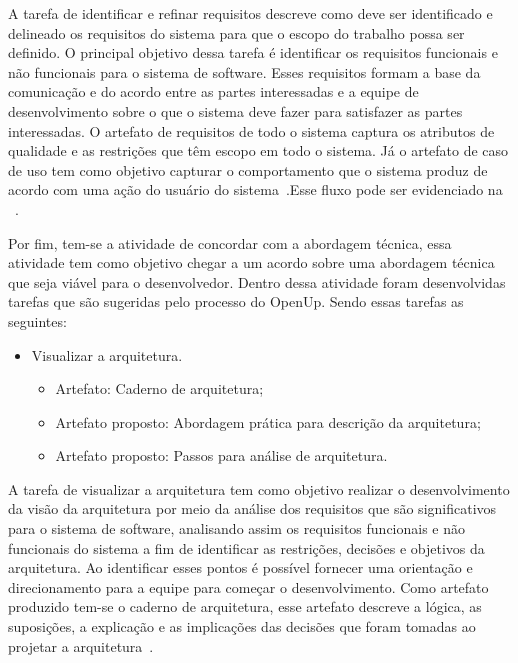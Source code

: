 %

A tarefa de identificar e refinar requisitos descreve como deve ser identificado e delineado os requisitos do sistema para que o escopo do trabalho possa ser definido. O principal objetivo dessa tarefa é identificar os requisitos funcionais e não funcionais para o sistema de software. Esses requisitos formam a base da comunicação e do acordo entre as partes interessadas e a equipe de desenvolvimento sobre o que o sistema deve fazer para satisfazer as partes interessadas. O artefato de requisitos de todo o sistema captura os atributos de qualidade e as restrições que têm escopo em todo o sistema. Já o artefato de caso de uso tem como objetivo capturar o comportamento que o sistema produz de acordo com uma ação do usuário do sistema~\cite{openup}.Esse fluxo pode ser evidenciado na ~.


Por fim, tem-se a atividade de concordar com a abordagem técnica, essa atividade tem como objetivo chegar a um acordo sobre uma abordagem técnica que seja viável para o desenvolvedor. Dentro dessa atividade foram desenvolvidas tarefas que são sugeridas pelo processo do \acrfull{OpenUp}. Sendo essas tarefas as seguintes:
\begin{itemize}
    \item Visualizar a arquitetura.
    \begin{itemize}
        \item Artefato: Caderno de arquitetura;
        \item Artefato proposto: Abordagem prática para descrição da arquitetura;
        \item Artefato proposto: Passos para análise de arquitetura.
    \end{itemize}
\end{itemize}

A tarefa de visualizar a arquitetura tem como objetivo realizar o desenvolvimento da visão da arquitetura por meio da análise dos requisitos que são significativos para o sistema de software, analisando assim os requisitos funcionais e não funcionais do sistema a fim de identificar as restrições, decisões e objetivos da arquitetura. Ao identificar esses pontos é possível fornecer uma orientação e direcionamento para a equipe para começar o desenvolvimento. Como artefato produzido tem-se o caderno de arquitetura, esse artefato descreve a lógica, as suposições, a explicação e as implicações das decisões que foram tomadas ao projetar a arquitetura~\cite{openup}.

